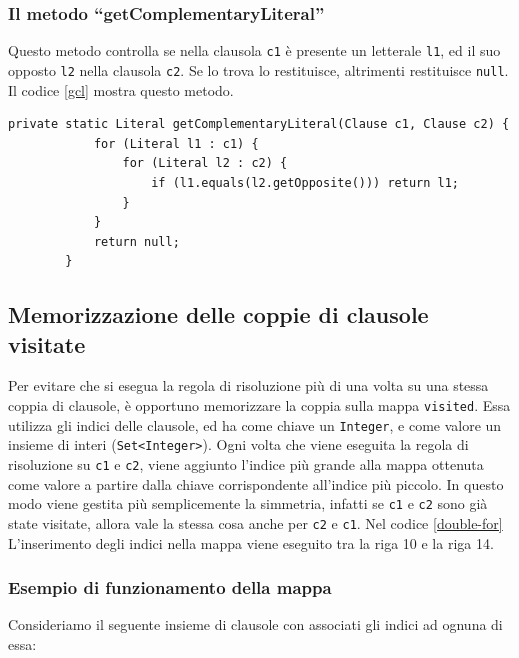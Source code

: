 \documentclass[a4paper,12pt]{report}
\begin{document}
\subsubsection{Il metodo ``getComplementaryLiteral''}
Questo metodo controlla se nella clausola \texttt{c1} è presente un letterale \texttt{l1}, ed il suo opposto \texttt{l2} nella clausola \texttt{c2}. Se lo trova lo restituisce, altrimenti restituisce \texttt{null}. Il codice \ref*{gcl} mostra questo metodo. 

\begin{minipage}{\linewidth}
    \begin{lstlisting}[caption={Metodo ``getComplementaryLiteral'' della classe Resolution}, label={gcl}]
        private static Literal getComplementaryLiteral(Clause c1, Clause c2) { 
            for (Literal l1 : c1) {
                for (Literal l2 : c2) { 
                    if (l1.equals(l2.getOpposite())) return l1;
                }
            }
            return null;
        }
    \end{lstlisting}
\end{minipage}

\subsection{Memorizzazione delle coppie di clausole visitate}
\label{visited}
Per evitare che si esegua la regola di risoluzione più di una volta su una stessa coppia di clausole, è opportuno memorizzare la coppia sulla mappa \texttt{visited}. Essa utilizza gli indici delle clausole, ed ha come chiave un \texttt{Integer}, e come valore un insieme di interi (\texttt{Set<Integer>}). Ogni volta che viene eseguita la regola di risoluzione su \texttt{c1} e \texttt{c2}, viene aggiunto l'indice più grande alla mappa ottenuta come valore a partire dalla chiave corrispondente all'indice più piccolo. In questo modo viene gestita più semplicemente la simmetria, infatti se \texttt{c1} e \texttt{c2} sono già state visitate, allora vale la stessa cosa anche per \texttt{c2} e \texttt{c1}. Nel codice \ref{double-for} L'inserimento degli indici nella mappa viene eseguito tra la riga 10 e la riga 14.

\subsubsection{Esempio di funzionamento della mappa}
Consideriamo il seguente insieme di clausole con associati gli indici ad ognuna di essa:
\end{document}
